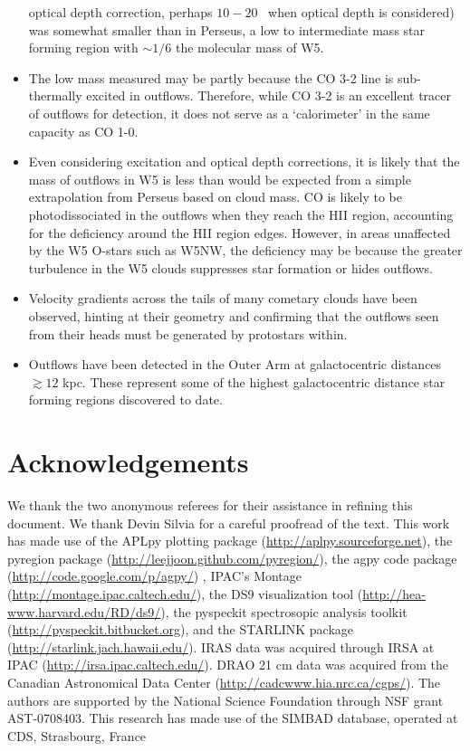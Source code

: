 \begin{itemize}
      optical depth correction, perhaps $10-20$ \msun\ when optical depth is
      considered) was somewhat smaller than in Perseus, a low to intermediate
      mass star forming region with $\sim 1/6$ the molecular mass of W5. 
    \item The low mass measured may be partly because the CO 3-2 line is
      sub-thermally excited in outflows.  Therefore, while CO 3-2 is an
      excellent tracer of outflows for detection, it does not serve as a
      `calorimeter' in the same capacity as CO 1-0.
    \item Even considering excitation and optical depth corrections, it is
      likely that the mass of outflows in W5 is less than would be expected
      from a simple extrapolation from Perseus based on cloud mass. CO is
      likely to be photodissociated in the outflows when they reach the HII
      region, accounting for the deficiency around the HII region edges.
      However, in areas unaffected by the W5 O-stars such as W5NW, the
      deficiency may be because the greater turbulence in the W5 clouds
      suppresses star formation or hides outflows.
    \item Velocity gradients across the tails of many cometary clouds have been
      observed, hinting at their geometry and confirming that the outflows seen
      from their heads must be generated by protostars within.
    \item Outflows have been detected in the Outer Arm at galactocentric
      distances $\gtrsim12$ kpc.  These represent some of the highest
      galactocentric distance star forming regions discovered to date.
\end{itemize}

\section{Acknowledgements}
We thank the two anonymous referees for their assistance in refining this
document.  We thank Devin Silvia for a careful proofread of the text. This work
has made use of the APLpy plotting package
(\url{http://aplpy.sourceforge.net}), the pyregion package
(\url{http://leejjoon.github.com/pyregion/}), the agpy code package
(\url{http://code.google.com/p/agpy/}) , IPAC's Montage
(\url{http://montage.ipac.caltech.edu/}), the DS9 visualization tool
(\url{http://hea-www.harvard.edu/RD/ds9/}), the pyspeckit spectrosopic analysis
toolkit (\url{http://pyspeckit.bitbucket.org}), and the STARLINK package
(\url{http://starlink.jach.hawaii.edu/}).  IRAS data was acquired through IRSA
at IPAC (\url{http://irsa.ipac.caltech.edu/}).  DRAO 21 cm data was acquired
from the Canadian Astronomical Data Center
(\url{http://cadcwww.hia.nrc.ca/cgps/}).  The authors are supported by the
National Science Foundation through NSF grant AST-0708403.  This research has
made use of the SIMBAD database, operated at CDS, Strasbourg, France

